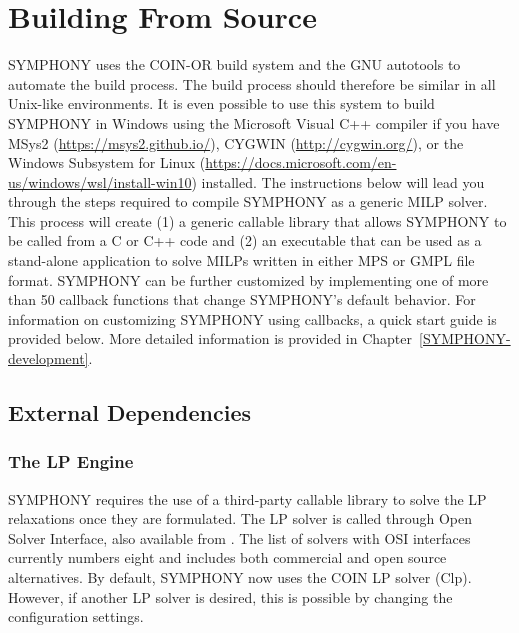 

\section{Building From Source} 
\label{building_from_source}

SYMPHONY uses the COIN-OR build system and the GNU autotools to automate the
build process. The build process should therefore be similar in all
Unix-like environments. It is even possible to use this system to build SYMPHONY
in Windows using the Microsoft Visual C++ compiler if you have MSys2
(\url{https://msys2.github.io/}), CYGWIN (\url{http://cygwin.org/}), or the
Windows Subsystem for Linux
(\url{https://docs.microsoft.com/en-us/windows/wsl/install-win10}) installed.
The instructions below will lead you through the steps required to compile
SYMPHONY as a generic MILP solver. This process will create (1) a generic
callable library that allows SYMPHONY to be called from a C or C++ code and
(2) an executable that can be used as a stand-alone application to solve MILPs
written in either MPS or GMPL file format. SYMPHONY can be further customized
by implementing one of more than 50 callback functions that change SYMPHONY's
default behavior. For information on customizing SYMPHONY using callbacks, a
quick start guide is provided below. More detailed information is provided in
Chapter~\ref{SYMPHONY-development}.

\subsection{External Dependencies}

\subsubsection{The LP Engine} SYMPHONY requires the use of a third-party
  callable library to solve the LP relaxations once they are formulated. The
LP solver is called through Open Solver Interface, also available from
.
The list of solvers with OSI interfaces currently numbers eight and includes
both commercial and open source alternatives. By default, SYMPHONY now uses
the COIN LP solver (Clp). However, if another LP solver is desired, this is
possible by changing the configuration settings.


